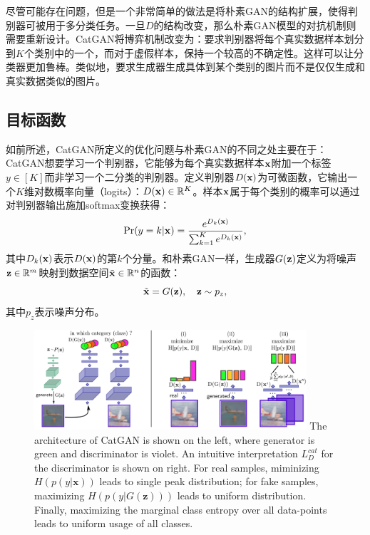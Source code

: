 尽管可能存在问题，但是一个非常简单的做法是将朴素GAN的结构扩展，使得判别器可被用于多分类任务。一旦$D$的结构改变，那么朴素GAN模型的对抗机制则需要重新设计。CatGAN将博弈机制改变为：要求判别器将每个真实数据样本划分到$K$个类别中的一个，而对于虚假样本，保持一个较高的不确定性。这样可以让分类器更加鲁棒。类似地，要求生成器生成具体到某个类别的图片而不是仅仅生成和真实数据类似的图片。

\subsection{目标函数}
如前所述，CatGAN所定义的优化问题与朴素GAN的不同之处主要在于：CatGAN想要学习一个判别器，它能够为每个真实数据样本$\mathbf{x}$附加一个标签$y \in [K]$而非学习一个二分类的判别器。定义判别器$D(\mathbf{x})$为可微函数，它输出一个$K$维对数概率向量（logits）：$D(\mathbf{x}) \in \mathbb{R}^K$。样本$\mathbf{x}$属于每个类别的概率可以通过对判别器输出施加softmax变换获得：
\begin{equation}
  \Pr(y=k|\mathbf{x}) = \frac{e^{D_k(\mathbf{x})}}{\sum_{k=1}^K e^{D_k(\mathbf{x})}},
\end{equation}
其中$D_k(\mathbf{x})$表示$D(\mathbf{x})$的第$k$个分量。和朴素GAN一样，生成器$G(\mathbf{z})$定义为将噪声$\mathbf{z} \in \mathbb{R}^m$映射到数据空间$\tilde{\mathbf{x}} \in \mathbb{R}^n$的函数：
\begin{equation}
  \tilde{\mathbf{x}} = G(\mathbf{z}), \quad \mathbf{z} \sim p_z,
\end{equation}
其中$p_z$表示噪声分布。

\begin{figure}[hbtp]
  \centering
  \includegraphics[width=0.9\textwidth]{Img/arch-catgan.png}
  {The architecture of CatGAN is shown on the left, where generator is green and discriminator is violet. An intuitive interpretation $L_D^{cat}$ for the discriminator is shown on right. For real samples, miminizing $H(p(y|\mathbf{x}))$ leads to single peak distribution; for fake samples, maximizing $H(p(y|G(\mathbf{z})))$ leads to uniform distribution. Finally, maximizing the marginal class entropy over all data-points leads to uniform usage of all classes.}
  \label{fig:arch-catgan}
\end{figure}

